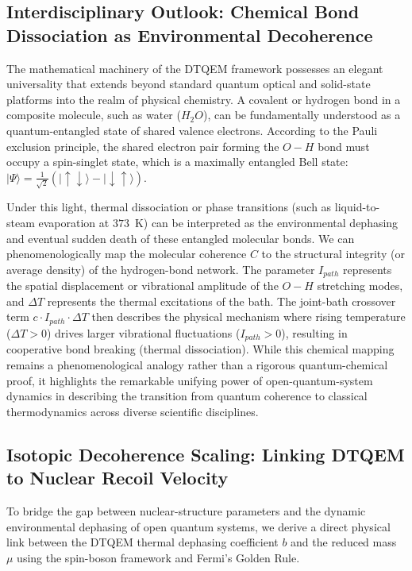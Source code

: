 \documentclass[reprint,amsmath,amssymb,aps,pra,superscriptaddress]{revtex4-2}
\begin{document}
\subsection{Interdisciplinary Outlook: Chemical Bond Dissociation as Environmental Decoherence}

The mathematical machinery of the DTQEM framework possesses an elegant universality that extends beyond standard quantum optical and solid-state platforms into the realm of physical chemistry. A covalent or hydrogen bond in a composite molecule, such as water ($H_2O$), can be fundamentally understood as a quantum-entangled state of shared valence electrons. According to the Pauli exclusion principle, the shared electron pair forming the $O-H$ bond must occupy a spin-singlet state, which is a maximally entangled Bell state: $|\Psi\rangle = \frac{1}{\sqrt{2}}(|\uparrow\downarrow\rangle - |\downarrow\uparrow\rangle)$.

Under this light, thermal dissociation or phase transitions (such as liquid-to-steam evaporation at $373$~K) can be interpreted as the environmental dephasing and eventual sudden death of these entangled molecular bonds. We can phenomenologically map the molecular coherence $C$ to the structural integrity (or average density) of the hydrogen-bond network. The parameter $I_{path}$ represents the spatial displacement or vibrational amplitude of the $O-H$ stretching modes, and $\Delta T$ represents the thermal excitations of the bath. The joint-bath crossover term $c \cdot I_{path} \cdot \Delta T$ then describes the physical mechanism where rising temperature ($\Delta T > 0$) drives larger vibrational fluctuations ($I_{path} > 0$), resulting in cooperative bond breaking (thermal dissociation). While this chemical mapping remains a phenomenological analogy rather than a rigorous quantum-chemical proof, it highlights the remarkable unifying power of open-quantum-system dynamics in describing the transition from quantum coherence to classical thermodynamics across diverse scientific disciplines.

\subsection{Isotopic Decoherence Scaling: Linking DTQEM to Nuclear Recoil Velocity}

To bridge the gap between nuclear-structure parameters and the dynamic environmental dephasing of open quantum systems, we derive a direct physical link between the DTQEM thermal dephasing coefficient $b$ and the reduced mass $\mu$ using the spin-boson framework and Fermi's Golden Rule.
\end{document}
